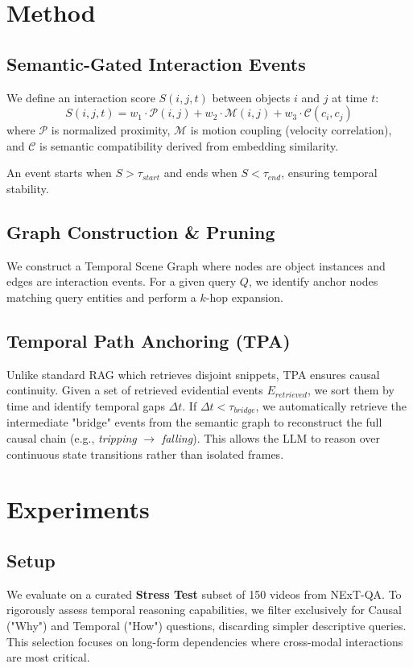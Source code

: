 \documentclass[10pt,twocolumn,letterpaper]{article}
\begin{document}
\section{Method}

\subsection{Semantic-Gated Interaction Events}
We define an interaction score $S(i,j,t)$ between objects $i$ and $j$ at time $t$:
\begin{equation}
    S(i,j,t) = w_1 \cdot \mathcal{P}(i,j) + w_2 \cdot \mathcal{M}(i,j) + w_3 \cdot \mathcal{C}(c_i, c_j)
\end{equation}
where $\mathcal{P}$ is normalized proximity, $\mathcal{M}$ is motion coupling (velocity correlation), and $\mathcal{C}$ is semantic compatibility derived from embedding similarity.

An event starts when $S > \tau_{start}$ and ends when $S < \tau_{end}$, ensuring temporal stability.

\subsection{Graph Construction \& Pruning}
We construct a Temporal Scene Graph where nodes are object instances and edges are interaction events. For a given query $Q$, we identify anchor nodes matching query entities and perform a $k$-hop expansion.

\subsection{Temporal Path Anchoring (TPA)}
Unlike standard RAG which retrieves disjoint snippets, TPA ensures causal continuity. Given a set of retrieved evidential events $E_{retrieved}$, we sort them by time and identify temporal gaps $\Delta t$. If $\Delta t < \tau_{bridge}$, we automatically retrieve the intermediate "bridge" events from the semantic graph to reconstruct the full causal chain (e.g., \textit{tripping} $\rightarrow$ \textit{falling}). This allows the LLM to reason over continuous state transitions rather than isolated frames.

\section{Experiments}

\subsection{Setup}
We evaluate on a curated \textbf{Stress Test} subset of 150 videos from NExT-QA. To rigorously assess temporal reasoning capabilities, we filter exclusively for Causal ("Why") and Temporal ("How") questions, discarding simpler descriptive queries. This selection focuses on long-form dependencies where cross-modal interactions are most critical.
\end{document}

